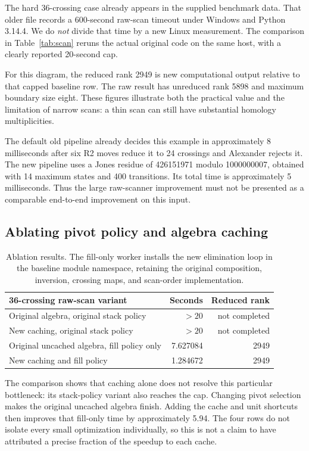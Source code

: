 \documentclass[11pt]{article}
\theoremstyle{definition}\newtheorem{definition}[theorem]{Definition}
\theoremstyle{remark}\newtheorem{remark}[theorem]{Remark}
\begin{document}
The hard 36-crossing case already appears in the supplied benchmark data.
That older file records a 600-second raw-scan timeout under Windows and
Python 3.14.4. We do \emph{not} divide that time by a new Linux measurement.
The comparison in Table~\ref{tab:scan} reruns the actual original code on the
same host, with a clearly reported 20-second cap.

For this diagram, the reduced rank 2949 is new computational output relative
to that capped baseline row. The raw result has unreduced rank 5898 and
maximum boundary size eight. These figures illustrate both the practical
value and the limitation of narrow scans: a thin scan can still have
substantial homology multiplicities.

The default old pipeline already decides this example in approximately
8 milliseconds after six R2 moves reduce it to 24 crossings and Alexander
rejects it. The new pipeline uses a Jones residue of 426151971 modulo
1000000007, obtained with 14 maximum states and 400 transitions. Its total
time is approximately 5 milliseconds. Thus the large raw-scanner improvement
must not be presented as a comparable end-to-end improvement on this input.

\subsection{Ablating pivot policy and algebra caching}

\begin{table}[htbp]
\centering
\begin{tabular}{@{}p{3.45in}rr@{}}
\toprule
36-crossing raw-scan variant & Seconds & Reduced rank\\
\midrule
Original algebra, original stack policy & $>20$ & not completed\\
New caching, original stack policy & $>20$ & not completed\\
Original uncached algebra, fill policy only & 7.627084 & 2949\\
New caching and fill policy & 1.284672 & 2949\\
\bottomrule
\end{tabular}
\caption{Ablation results. The fill-only worker installs the new elimination
loop in the baseline module namespace, retaining the original composition,
inversion, crossing maps, and scan-order implementation.}
\label{tab:ablation}
\end{table}

The comparison shows that caching alone does not resolve this particular
bottleneck: its stack-policy variant also reaches the cap. Changing pivot
selection makes the original uncached algebra finish. Adding the cache and
unit shortcuts then improves that fill-only time by approximately 5.94.
The four rows do not isolate every small optimization individually, so this
is not a claim to have attributed a precise fraction of the speedup to each
cache.
\end{document}
